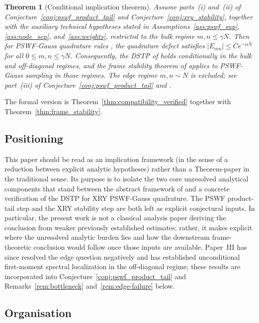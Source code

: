 \documentclass[12pt,a4paper]{amsart}
\newtheorem{theorem}{Theorem}[section]
\theoremstyle{definition}
\begin{document}
\begin{theorem}[Conditional implication theorem]\label{thm:main_informal}
Assume parts~(i) and~(ii) of Conjecture~\ref{conj:pswf_product_tail}
and Conjecture~\ref{conj:xry_stability},
together with the auxiliary technical hypotheses stated in
Assumptions~\ref{ass:pswf_sup}, \ref{ass:node_sep}, and~\ref{ass:weights},
restricted to the bulk regime $m,n\le\gamma N$.
Then for PSWF-Gauss quadrature rules \cite{Xiao2001}, the quadrature defect
satisfies $|E_{mn}|\le Ce^{-\alpha N}$ for all $0\le m,n\le\gamma N$.
Consequently, the DSTP of \cite{PaperI} holds conditionally
in the bulk and off-diagonal regimes, and the frame stability theorem
of \cite{PaperI} applies to PSWF-Gauss sampling in those regimes.
The edge regime $m,n\sim N$ is excluded; see part~(iii) of
Conjecture~\ref{conj:pswf_product_tail} and \cite{PaperIII}.
\end{theorem}

The formal version is Theorem~\ref{thm:compatibility_verified} together
with Theorem~\ref{thm:frame_stability}.

\subsection*{Positioning}

This paper should be read as an implication framework (in the sense of a
reduction between explicit analytic hypotheses) rather than a Theorem-paper
in the traditional sense. Its purpose is to isolate the two core unresolved
analytical components that stand between the abstract framework of
\cite{PaperI} and a concrete verification of the DSTP for XRY PSWF-Gauss
quadrature.
The PSWF product-tail step and the XRY stability step are both left as
explicit conjectural inputs. In particular, the present work is not a
classical analysis paper deriving the conclusion from weaker previously
established estimates; rather, it makes explicit where the unresolved
analytic burden lies and how the downstream frame-theoretic conclusion would
follow once those inputs are available.
Paper~III \cite{PaperIII} has since resolved the edge question negatively
and has established unconditional first-moment spectral localization
in the off-diagonal regime; these results are incorporated into
Conjecture~\ref{conj:pswf_product_tail} and Remarks~\ref{rem:bottleneck}
and~\ref{rem:edge-failure} below.

\subsection*{Organisation}
\end{document}
